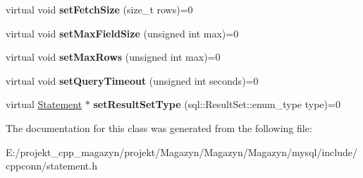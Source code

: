 \begin{DoxyCompactItemize}
virtual void {\bfseries set\+Fetch\+Size} (size\+\_\+t rows)=0
\item 
\hypertarget{classsql_1_1_statement_a4cbc05f0c9dbc97237c6245fa5bfc46c}{}\label{classsql_1_1_statement_a4cbc05f0c9dbc97237c6245fa5bfc46c} 
virtual void {\bfseries set\+Max\+Field\+Size} (unsigned int max)=0
\item 
\hypertarget{classsql_1_1_statement_ad52108d248bd1272e8f80b53a549e51d}{}\label{classsql_1_1_statement_ad52108d248bd1272e8f80b53a549e51d} 
virtual void {\bfseries set\+Max\+Rows} (unsigned int max)=0
\item 
\hypertarget{classsql_1_1_statement_af3367d2f09798ad17d2e0605bc768a4f}{}\label{classsql_1_1_statement_af3367d2f09798ad17d2e0605bc768a4f} 
virtual void {\bfseries set\+Query\+Timeout} (unsigned int seconds)=0
\item 
\hypertarget{classsql_1_1_statement_a6d25bd789114a649f22af3aa940ef735}{}\label{classsql_1_1_statement_a6d25bd789114a649f22af3aa940ef735} 
virtual \hyperlink{classsql_1_1_statement}{Statement} $\ast$ {\bfseries set\+Result\+Set\+Type} (sql\+::\+Result\+Set\+::enum\+\_\+type type)=0
\end{DoxyCompactItemize}


The documentation for this class was generated from the following file\+:\begin{DoxyCompactItemize}
\item 
E\+:/projekt\+\_\+cpp\+\_\+magazyn/projekt/\+Magazyn/\+Magazyn/\+Magazyn/mysql/include/cppconn/statement.\+h\end{DoxyCompactItemize}
